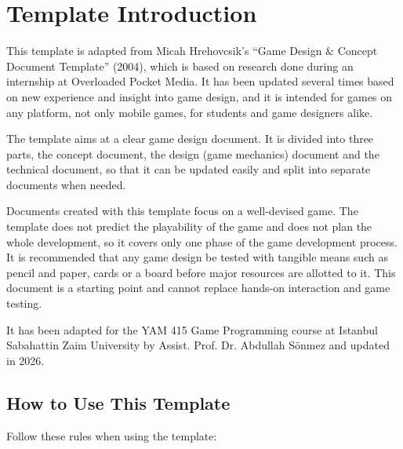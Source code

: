 \section{Template Introduction}

This template is adapted from Micah Hrehovcsik’s “Game Design \& Concept Document Template” (2004), which is based on research done during an internship at Overloaded Pocket Media. It has been updated several times based on new experience and insight into game design, and it is intended for games on any platform, not only mobile games, for students and game designers alike.

The template aims at a clear game design document. It is divided into three parts, the concept document, the design (game mechanics) document and the technical document, so that it can be updated easily and split into separate documents when needed.

Documents created with this template focus on a well-devised game. The template does not predict the playability of the game and does not plan the whole development, so it covers only one phase of the game development process. It is recommended that any game design be tested with tangible means such as pencil and paper, cards or a board before major resources are allotted to it. This document is a starting point and cannot replace hands-on interaction and game testing.

It has been adapted for the YAM 415 Game Programming course at Istanbul Sabahattin Zaim University by Assist. Prof. Dr. Abdullah Sönmez and updated in 2026.

\subsection{How to Use This Template}

Follow these rules when using the template:


